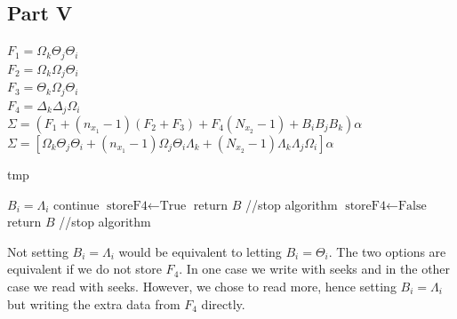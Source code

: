 \documentclass[conference]{IEEEtran}
\begin{document}
  \subsection{Part V}
  \noindent $F_1 = \Omega_k \Theta_j \Theta_i$ \\
  $F_2 = \Omega_k \Omega_j \Theta_i$ \\
  $F_3 = \Theta_k \Omega_j \Theta_i$ \\
  $F_4 = \Delta_k \Delta_j \Omega_i$ \\

  \noindent $\Sigma = (F_1 + (n_{x_1}-1)(F_2 + F_3) + F_4(N_{x_2}-1) + B_iB_jB_k)\alpha$ \\
  $\Sigma = [\Omega_k\Theta_j\Theta_i + (n_{x_1}-1)\Omega_j\Theta_i\Lambda_k + (N_{x_2}-1)\Lambda_k\Lambda_j\Omega_i]\alpha$

  \begin{algorithm}[h]
    \caption{tmp}
    \begin{algorithmic}[1]
    \STATE $B_i = \Lambda_i$
      \STATE continue
      \STATE $\textrm{storeF4} \leftarrow \textrm{True}$
      \STATE return $B$ //stop algorithm
    \ELSE
      \STATE $\textrm{storeF4} \leftarrow \textrm{False}$
      \STATE return $B$ //stop algorithm
    \ENDIF
    \end{algorithmic}
  \end{algorithm}

  Not setting $B_i = \Lambda_i$ would be equivalent to letting $B_i = \Theta_i$.
  The two options are equivalent if we do not store $F_4$.
  In one case we write with seeks and in the other case we read with seeks.
  However, we chose to read more, hence setting $B_i = \Lambda_i$ but writing the extra data from $F_4$ directly.
\end{document}
